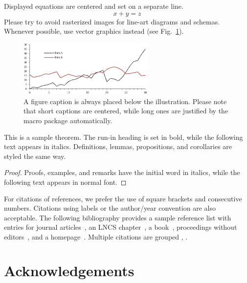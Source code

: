 \documentclass{llncs}
\begin{document}
	\noindent Displayed equations are centered and set on a separate
	line.
	\begin{equation}
	x + y = z
	\end{equation}
	Please try to avoid rasterized images for line-art diagrams and
	schemas. Whenever possible, use vector graphics instead (see
	Fig.~\ref{fig1}).
	
	\begin{figure}
		\includegraphics[width=0.6\textwidth]{fig1.eps}
		\centering
		\caption{A figure caption is always placed below the illustration.
			Please note that short captions are centered, while long ones are
			justified by the macro package automatically.} \label{fig1}
	\end{figure}
	
	\begin{theorem}
		This is a sample theorem. The run-in heading is set in bold, while
		the following text appears in italics. Definitions, lemmas,
		propositions, and corollaries are styled the same way.
	\end{theorem}
	\begin{proof}
		Proofs, examples, and remarks have the initial word in italics,
		while the following text appears in normal font.
	\end{proof}
	For citations of references, we prefer the use of square brackets
	and consecutive numbers. Citations using labels or the author/year
	convention are also acceptable. The following bibliography provides
	a sample reference list with entries for journal
	articles~\cite{ref_article1}, an LNCS chapter~\cite{ref_lncs1}, a
	book~\cite{ref_book1}, proceedings without editors~\cite{ref_proc1},
	and a homepage~\cite{ref_url1}. Multiple citations are grouped
	\cite{ref_article1,ref_lncs1,ref_book1},
	\cite{ref_article1,ref_book1,ref_proc1,ref_url1}.
	
	
	\section*{Acknowledgements}
	
\end{document}
